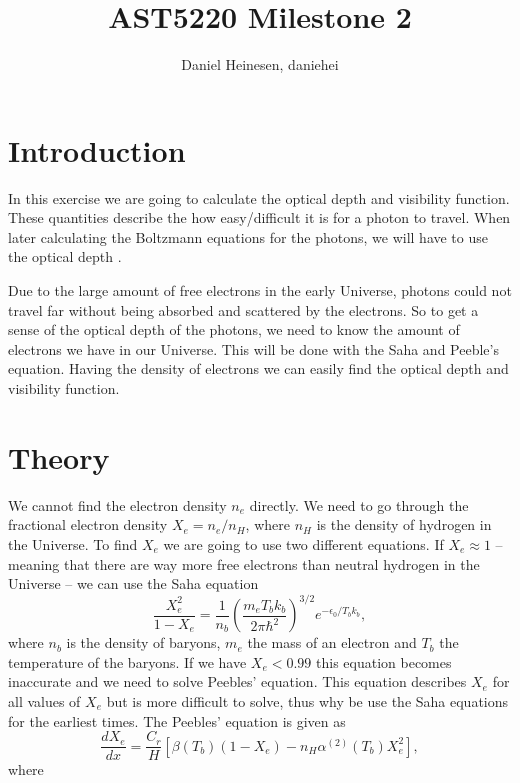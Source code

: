 \documentclass[a4paper,norsk, 10pt]{article}
\title{AST5220 Milestone 2}
\author{Daniel Heinesen, daniehei}
\begin{document}
\maketitle
\section{Introduction}
In this exercise we are going to calculate the optical depth and visibility function. These quantities describe the how easy/difficult it is for a photon to travel.  When later calculating the Boltzmann equations for the photons, we will have to use the optical depth .

Due to the large amount of free electrons in the early Universe, photons could not travel far without being absorbed and scattered by the electrons. So to get a sense of the optical depth of the photons, we need to know the amount of electrons we have in our Universe. This will be done with the Saha and Peeble's equation. Having the density of electrons we can easily find the optical depth and visibility function.

\section{Theory}
We cannot find the electron density $n_e$ directly. We need to go through the fractional electron density $X_e = n_e/n_H$, where $n_H$ is the density of hydrogen in the Universe. To find $X_e$ we are going to use two different equations. If $X_e \approx 1$ -- meaning that there are way more free electrons than neutral hydrogen in the Universe -- we can use the Saha equation
\begin{equation}
\frac{X_e^2}{1-X_e} = \frac{1}{n_b}\left(\frac{m_e T_b k_b}{2\pi \hbar^2}\right)^{3/2} e^{-\epsilon_0/T_b k_b},
\end{equation}
where $n_b$ is the density of baryons, $m_e$ the mass of an electron and $T_b$ the temperature of the baryons. If we have $X_e < 0.99$ this equation becomes inaccurate and we need to solve Peebles' equation. This equation describes $X_e$ for all values of $X_e$ but is more difficult to solve, thus why be use the Saha equations for the earliest times. The Peebles' equation is given as
\begin{equation}\label{eq:peebles}
\frac{dX_e}{dx} = \frac{C_r}{H}\left[\beta (T_b)(1-X_e) - n_H \alpha^{(2)}(T_b)X_e^2 \right],
\end{equation}
where
\end{document}
